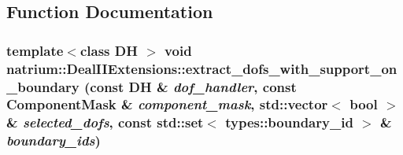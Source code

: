 \subsection{Function Documentation}
\hypertarget{namespacenatrium_1_1DealIIExtensions_ad74bfc63a45e2d4c1c9f2dd625cf1a66}{
\subsubsection[{extract\_\-dofs\_\-with\_\-support\_\-on\_\-boundary}]{\setlength{\rightskip}{0pt plus 5cm}template$<$class DH $>$ void natrium::DealIIExtensions::extract\_\-dofs\_\-with\_\-support\_\-on\_\-boundary (const DH \& {\em dof\_\-handler}, \/  const ComponentMask \& {\em component\_\-mask}, \/  std::vector$<$ bool $>$ \& {\em selected\_\-dofs}, \/  const std::set$<$ types::boundary\_\-id $>$ \& {\em boundary\_\-ids})}}
\label{namespacenatrium_1_1DealIIExtensions_ad74bfc63a45e2d4c1c9f2dd625cf1a66}


